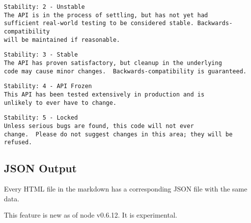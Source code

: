 \begin{verbatim}
Stability: 2 - Unstable
The API is in the process of settling, but has not yet had
sufficient real-world testing to be considered stable. Backwards-compatibility
will be maintained if reasonable.
\end{verbatim}

\begin{verbatim}
Stability: 3 - Stable
The API has proven satisfactory, but cleanup in the underlying
code may cause minor changes.  Backwards-compatibility is guaranteed.
\end{verbatim}

\begin{verbatim}
Stability: 4 - API Frozen
This API has been tested extensively in production and is
unlikely to ever have to change.
\end{verbatim}

\begin{verbatim}
Stability: 5 - Locked
Unless serious bugs are found, this code will not ever
change.  Please do not suggest changes in this area; they will be refused.
\end{verbatim}

\subsection{JSON Output}\label{json-output}

\begin{Shaded}
\begin{Highlighting}[]
 
\end{Highlighting}
\end{Shaded}

Every HTML file in the markdown has a corresponding JSON file with the
same data.

This feature is new as of node v0.6.12. It is experimental.
